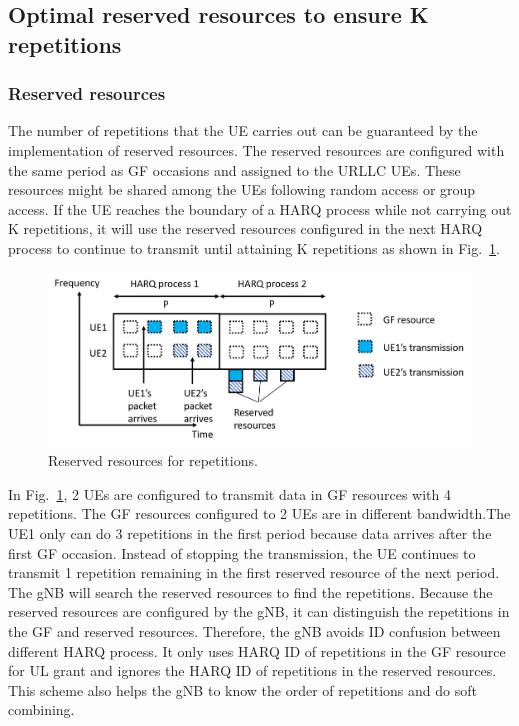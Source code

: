 \documentclass{ieeeaccess}
\begin{document}
\subsection{Optimal reserved resources to ensure K repetitions}\label{IIIB}

\subsubsection {Reserved resources}

The number of repetitions that the UE carries out can be guaranteed by the implementation of reserved resources. The reserved resources are configured with the same period as GF occasions and assigned to the URLLC UEs. These resources might be shared among the UEs following random access or group access. If the UE reaches the boundary of a HARQ process while not carrying out K repetitions, it will use the reserved resources configured in the next HARQ process to continue to transmit until attaining K repetitions as shown in Fig.~\ref{fig5}.

\begin{figure}[htbp]
\centerline{\includegraphics[scale=0.32]{fig5.png}}
\caption{Reserved resources for repetitions.}
\label{fig5}
\vspace{-2mm}
\end{figure}

In Fig.~\ref{fig5}, 2 UEs are configured to transmit data in GF resources with 4 repetitions. The GF resources configured to 2 UEs are in different bandwidth.The UE1 only can do 3 repetitions in the first period because data arrives after the first GF occasion. Instead of stopping the transmission, the UE continues to transmit 1 repetition remaining in the first reserved resource of the next period. The gNB will search the reserved resources to find the repetitions. Because the reserved resources are configured by the gNB, it can distinguish the repetitions in the GF and reserved resources. Therefore, the gNB avoids ID confusion between different HARQ process. It only uses HARQ ID of repetitions in the GF resource for UL grant and ignores the HARQ ID of repetitions in the reserved resources. This scheme also helps the gNB to know the order of repetitions and do soft combining.
\end{document}
